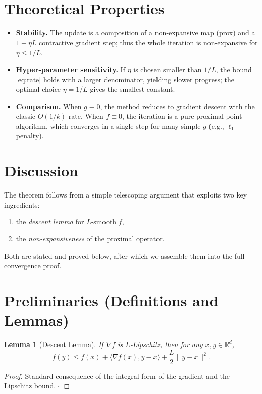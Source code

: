 \documentclass{article}
\newtheorem{lemma}{Lemma}
\begin{document}
\section*{Theoretical Properties}
\begin{itemize}[noitemsep]
\item \textbf{Stability.} The update is a composition of a non‑expansive map (prox) and a $1-\eta L$ contractive gradient step; thus the whole iteration is non‑expansive for $\eta\le 1/L$.
\item \textbf{Hyper‑parameter sensitivity.} If $\eta$ is chosen smaller than $1/L$, the bound \eqref{eq:rate} holds with a larger denominator, yielding slower progress; the optimal choice $\eta=1/L$ gives the smallest constant.
\item \textbf{Comparison.} When $g\equiv0$, the method reduces to gradient descent with the classic $O(1/k)$ rate. When $f\equiv0$, the iteration is a pure proximal point algorithm, which converges in a single step for many simple $g$ (e.g., $\ell_{1}$ penalty).
\end{itemize}

\section*{Discussion}
The theorem follows from a simple telescoping argument that exploits two key ingredients:
\begin{enumerate}[noitemsep]
\item the \emph{descent lemma} for $L$‑smooth $f$,
\item the \emph{non‑expansiveness} of the proximal operator.
\end{enumerate}
Both are stated and proved below, after which we assemble them into the full convergence proof.

\newpage
\section*{Preliminaries (Definitions and Lemmas)}
\begin{lemma}[Descent Lemma]\label{lem:descent}
If $\nabla f$ is $L$‑Lipschitz, then for any $x,y\in\mathbb{R}^{d}$,
\[
f(y)\le f(x)+\langle\nabla f(x),y-x\rangle+\frac{L}{2}\|y-x\|^{2}.
\]
\end{lemma}
\begin{proof}
Standard consequence of the integral form of the gradient and the Lipschitz bound. $\square$
\end{proof}
\end{document}
